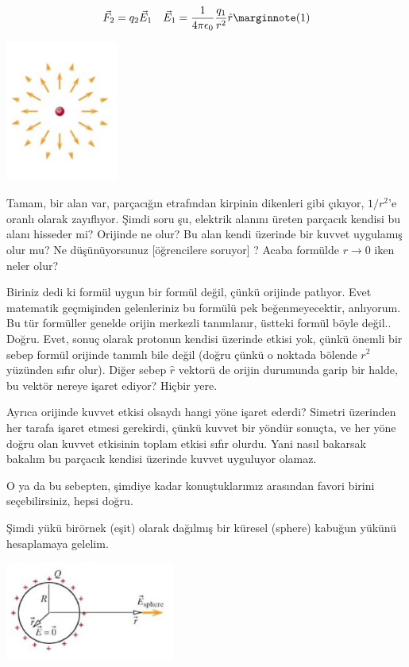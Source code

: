 \documentclass[12pt,fleqn]{article}\usepackage{../../common}
\begin{document}
$$
\vec{F}_2 = q_2 \vec{E}_1 \quad
\vec{E}_1 = \frac{1}{4\pi \epsilon_0} \frac{q_1}{r^2} \hat{r}
\mlabel{1}
$$

\includegraphics[width=10em]{02_05.png}

Tamam, bir alan var, parçacığın etrafından kirpinin dikenleri gibi çıkıyor,
$1/r^2$'e oranlı olarak zayıflıyor. Şimdi soru şu, elektrik alanını üreten
parçacık kendisi bu alanı hisseder mi? Orijinde ne olur?  Bu alan kendi üzerinde
bir kuvvet uygulamış olur mu? Ne düşünüyorsunuz [öğrencilere soruyor] ? Acaba
formülde $r \to 0$ iken neler olur?

Biriniz dedi ki formül uygun bir formül değil, çünkü orijinde patlıyor. Evet
matematik geçmişinden gelenleriniz bu formülü pek beğenmeyecektir, anlıyorum. Bu
tür formüller genelde orijin merkezli tanımlanır, üstteki formül böyle
değil.. Doğru. Evet, sonuç olarak protonun kendisi üzerinde etkisi yok, çünkü
önemli bir sebep formül orijinde tanımlı bile değil (doğru çünkü o noktada
bölende $r^2$ yüzünden sıfır olur). Diğer sebep $\hat{r}$ vektorü de orijin
durumunda garip bir halde, bu vektör nereye işaret ediyor?  Hiçbir yere.

Ayrıca orijinde kuvvet etkisi olsaydı hangi yöne işaret ederdi? Simetri
üzerinden her tarafa işaret etmesi gerekirdi, çünkü kuvvet bir yöndür sonuçta,
ve her yöne doğru olan kuvvet etkisinin toplam etkisi sıfır olurdu. Yani nasıl
bakarsak bakalım bu parçacık kendisi üzerinde kuvvet uyguluyor olamaz.

O ya da bu sebepten, şimdiye kadar konuştuklarımız arasından favori birini
seçebilirsiniz, hepsi doğru.

Şimdi yükü birörnek (eşit) olarak dağılmış bir küresel (sphere) kabuğun yükünü
hesaplamaya gelelim.

\includegraphics[width=15em]{02_06.png}
\end{document}
